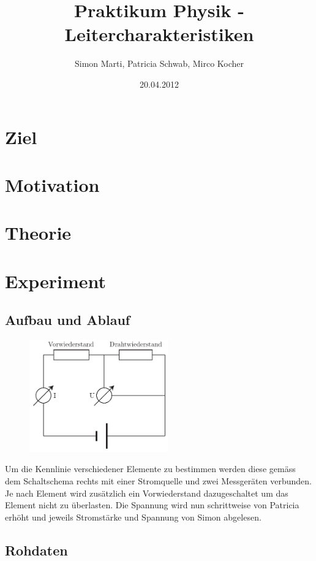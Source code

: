 \documentclass[12pt,a4paper]{article}
\title{Praktikum Physik - Leitercharakteristiken}
\author{Simon Marti, Patricia Schwab, Mirco Kocher}
\date{20.04.2012}
\begin{document}
\maketitle

\section*{Ziel}


\section*{Motivation}


\section*{Theorie}


\section*{Experiment}

\subsection*{Aufbau und Ablauf}
\begin{figure}
\vspace{-15pt}
\centering
\includegraphics[width=6cm]{illustration.pdf}
\end{figure}
Um die Kennlinie verschiedener Elemente zu bestimmen werden diese gem\"ass dem Schaltschema rechts mit einer Stromquelle und zwei Messger\"aten verbunden. Je nach Element wird zus\"atzlich ein Vorwiederstand dazugeschaltet um das Element nicht zu \"uberlasten. Die Spannung wird nun schrittweise von Patricia erh\"oht und jeweils Stromst\"arke und Spannung von Simon abgelesen. 


\subsection*{Rohdaten}
\end{document}
